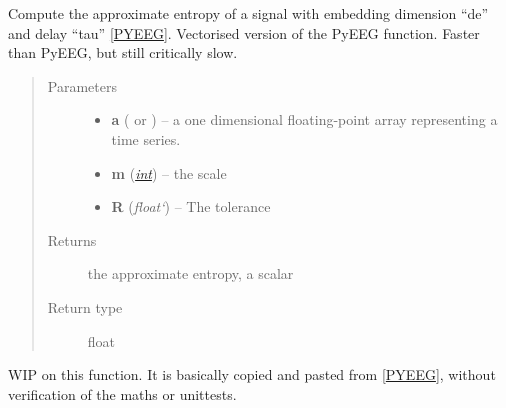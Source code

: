 \documentclass[letterpaper,10pt,english]{sphinxmanual}
\begin{document}
\begin{fulllineitems}
\label{pyrem.univariate:pyrem.univariate.ap_entropy}
Compute the approximate entropy of a signal with embedding dimension ``de'' and delay ``tau'' {\hyperref[pyrem.univariate:pyeeg]{{[}PYEEG{]}}}.
Vectorised version of the PyEEG function. Faster than PyEEG, but still critically slow.
\begin{quote}\begin{description}
\item[{Parameters}] \leavevmode\begin{itemize}
\item {} 
\textbf{a} (\href{http://docs.scipy.org/doc/numpy/reference/generated/numpy.ndarray.html\#numpy.ndarray}{} or {\hyperref[pyrem.time_series:pyrem.time_series.Signal]{}}) -- a one dimensional floating-point array representing a time series.

\item {} 
\textbf{m} (\href{http://docs.python.org/2.7/library/functions.html\#int}{\emph{int}}) -- the scale

\item {} 
\textbf{R} (\emph{float{}`}) -- The tolerance

\end{itemize}

\item[{Returns}] \leavevmode
the approximate entropy, a scalar

\item[{Return type}] \leavevmode
float

\end{description}\end{quote}

\end{fulllineitems}


\begin{fulllineitems}
\label{pyrem.univariate:pyrem.univariate.dfa}
WIP on this function. It is basically copied and pasted from {\hyperref[pyrem.univariate:pyeeg]{{[}PYEEG{]}}}, without verification of the maths or unittests.

\end{fulllineitems}
\end{document}
